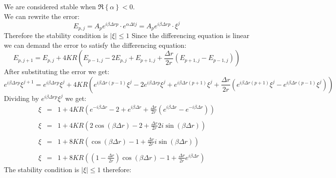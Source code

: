 \documentclass[11pt, a4paper]{article}
\begin{document}
We are considered stable when $\Re{\left\{\alpha\right\}}<0$. \\
We can rewrite the error:
\begin{equation}
    E_{p,j}=A_pe^{i\beta\Delta rp}\cdot e^{\alpha\Delta tj}=A_pe^{i\beta\Delta rp}\cdot\xi^j
\end{equation}
Therefore the stability condition is $\left|\xi\right|\le1$
Since the differencing equation is linear we can demand the error to satisfy the differencing equation:
\begin{equation}
    E_{p,j+1}=E_{p,j}+4KR\left(E_{p-1,j}-2E_{p,j}+E_{p+1,j}+\frac{\Delta r}{2r}\left(E_{p+1,j}-E_{p-1,j}\right)\right)
\end{equation}
After substituting the error we get:
\scriptsize
\begin{equation}
    e^{i\beta\Delta rp}\xi^{j+1}=e^{i\beta\Delta rp}\xi^j+4KR\left(e^{i\beta\Delta r\left(p-1\right)}\xi^j-2e^{i\beta\Delta rp}\xi^j+e^{i\beta\Delta r\left(p+1\right)}\xi^j+\frac{\Delta r}{2r}\left(e^{i\beta\Delta r\left(p+1\right)}\xi^j-e^{i\beta\Delta r\left(p-1\right)}\xi^j\right)\right)
\end{equation}
\normalsize
Dividing by $e^{i\beta\Delta rp}\xi^j$ we get:
\begin{equation}
    \begin{array}{rcl}
        \xi & = & \displaystyle 1+4KR\left(e^{-i\beta\Delta r}-2+e^{i\beta\Delta r}+\frac{\Delta r}{2r}\left(e^{i\beta\Delta r}-e^{-i\beta\Delta r}\right)\right) \\\\
        \xi & = & \displaystyle 1+4KR\left(2\cos{\left(\beta\Delta r\right)}-2+\frac{\Delta r}{2r}2i\sin{\left(\beta\Delta r\right)}\right) \\\\
        \xi & = & \displaystyle 1+8KR\left(\cos{\left(\beta\Delta r\right)}-1+\frac{\Delta r}{2r}i\sin{\left(\beta\Delta r\right)}\right) \\\\
        \xi & = & \displaystyle 1+8KR\left(\left(1-\frac{\Delta r}{2r}\right)\cos{\left(\beta\Delta r\right)}-1+\frac{\Delta r}{2r}e^{i\beta\Delta r}\right)
    \end{array}
\end{equation}
The stability condition is $\left|\xi\right|\le1$ therefore:
\end{document}

